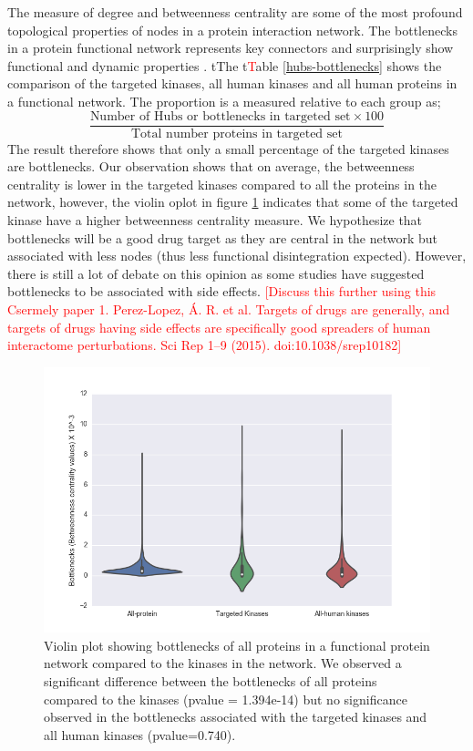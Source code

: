\documentclass[a4paper, 11pt]{article}
\newcommand{\redcomment}[1]{\textcolor{red}{[#1]}} %
\newcommand{\redinsert}[1]{\textcolor{red}{#1}} %
\begin{document}
The measure of degree and betweenness centrality are some of the most profound topological properties of nodes in a protein interaction network. The bottlenecks in a protein functional network represents key connectors and surprisingly show functional and dynamic properties \cite{yu2007importance}. \sou	t{The t}\redinsert{T}able \ref{hubs-bottlenecks} shows the comparison of the targeted kinases, all human kinases and all human proteins in a functional network. The proportion is a measured relative to each group as; 
\[
\frac{\text{Number of Hubs or bottlenecks in targeted set} \times100 } {\text{Total number proteins in targeted set}}
\]
The result therefore shows that only a small percentage of the targeted kinases are bottlenecks. Our observation shows that on average, the betweenness centrality is lower in the targeted kinases compared to all the proteins in the network, however, the violin oplot in figure \ref{bottle_measured} indicates that some of the targeted kinase have a higher betweenness centrality measure. We hypothesize that bottlenecks will be a good drug target as they are central in the network but associated with less nodes (thus less functional disintegration expected). However, there is still a lot of debate on this opinion as some studies have suggested bottlenecks to be associated with side effects. \redcomment{Discuss this further using this Csermely paper 1.	Perez-Lopez, Á. R. et al. Targets of drugs are generally, and targets of drugs having side effects are specifically good spreaders of human interactome perturbations. Sci Rep 1–9 (2015). doi:10.1038/srep10182}

\begin{figure}[H]
	\includegraphics[width=.9\linewidth]{figures/bottlenecks_ff2.png}
	\centering
	\caption{Violin plot showing bottlenecks of all proteins in a functional protein network compared to the kinases in the network. We observed a significant difference between the bottlenecks of all proteins compared to the kinases (pvalue = 1.394e-14) but no significance observed in the bottlenecks associated with the targeted kinases and all human kinases (pvalue=0.740).}
	\label{bottle_measured}
\end{figure}
\end{document}
